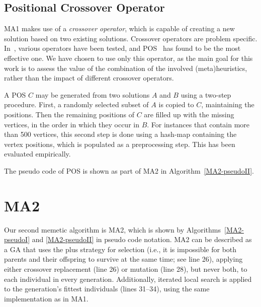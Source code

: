\documentclass[thesis.tex]{subfiles}
\begin{document}

\subsection{Positional Crossover Operator}
   \label{POS-desc}
%
\gls{MA1} makes use of a \emph{crossover operator}, which is capable of creating a new solution based on two existing solutions. Crossover operators are problem specific. In~\parencite{schafhauser-thesis,schafhauser-paper}, various operators have been tested, and \gls{POS}~\parencite{Syswerda:91a} has found to be the most effective one. We have chosen to use only this operator, as the main goal for this work is to assess the value of the combination of the involved (meta)heuristics, rather than the impact of different crossover operators.

A \gls{POS} $C$ may be generated from two solutions $A$ and $B$ using a two-step procedure. First, a randomly selected subset of $A$ is copied to $C$, maintaining the positions. Then the remaining positions of $C$ are filled up with the missing vertices, in the order in which they occur in $B$. For instances that contain more than 500 vertices, this second step is done using a hash-map containing the vertex positions, which is populated as a preprocessing step. This has been evaluated empirically.

The pseudo code of \gls{POS} is shown as part of \gls{MA2} in Algorithm~\vref{MA2-pseudoII}.



\clearpage
\section{MA2}  %
   \label{sec:MA2}
%
   Our second memetic algorithm is \gls{MA2}, which is shown by Algorithms~\vref{MA2-pseudoI} and \vref{MA2-pseudoII} in pseudo code notation. \gls{MA2} can be described as a \gls{GA} that uses the plus strategy for selection (i.e., it is impossible for both parents and their offspring to survive at the same time; see line 26), applying either crossover replacement (line 26) or mutation (line 28), but never both, to each individual in every generation. Additionally, iterated local search is applied to the generation's fittest individuals (lines 31--34), using the same implementation as in \gls{MA1}.
\end{document}
